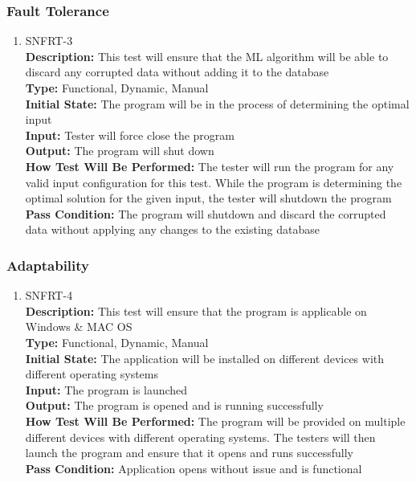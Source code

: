 \documentclass[12pt, titlepage]{article}
\begin{document}
\subsubsection{Fault Tolerance}
\begin{enumerate}
    \item{SNFRT-3\\}
    \textbf{Description:} This test will ensure that the ML algorithm will be able to discard any corrupted data without adding it to the database\\
    \textbf{Type:} Functional, Dynamic, Manual\\
    \textbf{Initial State:} The program will be in the process of determining the optimal input\\
    \textbf{Input:} Tester will force close the program\\
    \textbf{Output:} The program will shut down\\
    \textbf{How Test Will Be Performed:} The tester will run the program for any valid input configuration for this test. While the program is determining the optimal solution for the given input, the tester will shutdown the program\\
    \textbf{Pass Condition:} The program will shutdown and discard the corrupted data without applying any changes to the existing database\\
\end{enumerate}

\subsubsection{Adaptability}
\begin{enumerate}
    \item{SNFRT-4\\}
    \textbf{Description:} This test will ensure that the program is applicable on Windows \& MAC OS\\
    \textbf{Type:} Functional, Dynamic, Manual\\
    \textbf{Initial State:} The application will be installed on different devices with different operating systems\\
    \textbf{Input:} The program is launched\\
    \textbf{Output:} The program is opened and is running successfully\\
    \textbf{How Test Will Be Performed:} The program will be provided on multiple different devices with different operating systems. The testers will then launch the program and ensure that it opens and runs successfully\\
    \textbf{Pass Condition:} Application opens without issue and is functional\\
\end{enumerate}
\end{document}
